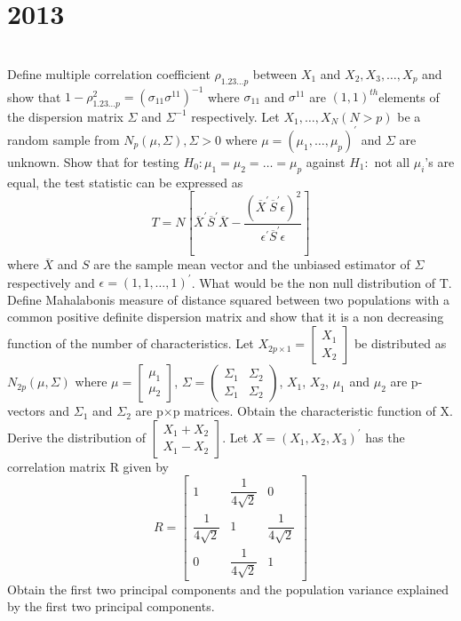 \section*{2013}
\vspace{-.5cm}
\hrulefill \smallskip\\
 Define multiple correlation coefficient $\rho_{1.23\ldots p}$ between $X_1$ and $X_2,X_3,\ldots,X_p$ and show that $1 - \rho_{1.23\ldots p}^{2} = (\sigma_{11} \sigma^{11})^{-1}$ where $\sigma_{11}$ and $\sigma^{11}$ are $(1,1)^{th}$elements of the dispersion matrix $\Sigma$ and $\Sigma^{-1}$ respectively.
\myline
{} Let $X_1,\ldots,X_N (N>p)$ be a random sample from $N_p(\mu,\Sigma), \Sigma > 0$ where $\mu = (\mu_1,\ldots,\mu_p)^{\prime} $ and $\Sigma$ are unknown. Show that for testing $H_0 : \mu_1 = \mu_2 = \ldots=\mu_p$ against $H_1 :$ not all $\mu_i$'s are equal, the test statistic can be expressed as \[ T = N \left[\overline{X}^{\prime}\overline{S}^{\prime}\overline{X} - \dfrac{(\overline{X}^{\prime}\overline{S}^{\prime}\epsilon)^2}{\epsilon^{\prime}\overline{S}^{\prime}\epsilon}\right] \] where $\overline{X}$ and $S$ are the sample mean vector and the unbiased estimator of $\Sigma$ respectively and $\epsilon = (1,1, \ldots,1)^{\prime}$. What would be the non null distribution of T. 
\myline
{} Define Mahalabonis measure of distance squared between two populations with a common positive definite dispersion matrix and show that it is a non decreasing function of the number of characteristics.
\myline
{} Let $X_{2p\times1} = \begin{bmatrix} X_1 \\ X_2 \end{bmatrix}$ be distributed as $N_{2p}(\mu,\Sigma)$ where $\mu = \begin{bmatrix} \mu_1 \\ \mu_2 \end{bmatrix}$, $\Sigma = \begin{pmatrix} \Sigma_1 & \Sigma_2 \\ \Sigma_1 & \Sigma_2 \end{pmatrix}$, $X_1$, $X_2$, $\mu_1$ and $\mu_2$ are p-vectors and $\Sigma_1$ and $\Sigma_2$ are p$\times$p matrices. Obtain the characteristic function of X. Derive the distribution of $\begin{bmatrix} X_1 + X_2 \\ X_1 - X_2 \end{bmatrix}$.
\myline
{} Let $X = (X_1,X_2,X_3)^{\prime}$ has the correlation matrix R given by \[ R = \begin{bmatrix} 1 & \dfrac{1}{4\sqrt{2}} & 0 \\ \dfrac{1}{4\sqrt{2}} & 1 & \dfrac{1}{4\sqrt{2}} \\ 0 & \dfrac{1}{4\sqrt{2}} & 1\end{bmatrix} \] Obtain the first two principal components and the population variance explained by the first two principal components.